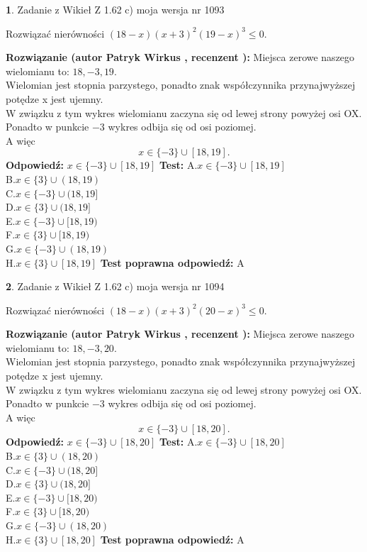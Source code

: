 \documentclass[12pt, a4paper]{article}
\theoremstyle{definition} %
\newtheorem{zad}{}
\newcommand{\zadStart}[1]{\begin{zad}#1\newline}
\newcommand{\zadStop}{\end{zad}}
\newcommand{\rozwStart}[2]{\noindent \textbf{Rozwiązanie (autor #1 , recenzent #2): }\newline}
\newcommand{\rozwStop}{\newline}
\newcommand{\odpStart}{\noindent \textbf{Odpowiedź:}\newline}
\newcommand{\odpStop}{\newline}
\newcommand{\testStart}{\noindent \textbf{Test:}\newline}
\newcommand{\testStop}{\newline}
\newcommand{\kluczStart}{\noindent \textbf{Test poprawna odpowiedź:}\newline}
\newcommand{\kluczStop}{\newline}
\begin{document}
\zadStart{Zadanie z Wikieł Z 1.62 c) moja wersja nr 1093}

Rozwiązać nierówności $(18-x)(x+3)^{2}(19-x)^{3}\le0$.
\zadStop
\rozwStart{Patryk Wirkus}{}
Miejsca zerowe naszego wielomianu to: $18, -3, 19$.\\
Wielomian jest stopnia parzystego, ponadto znak współczynnika przy\linebreak najwyższej potędze x jest ujemny.\\ W związku z tym wykres wielomianu zaczyna się od lewej strony powyżej osi OX.\\
Ponadto w punkcie $-3$ wykres odbija się od osi poziomej.\\
A więc $$x \in \{-3\} \cup [18,19].$$
\rozwStop
\odpStart
$x \in \{-3\} \cup [18,19]$
\odpStop
\testStart
A.$x \in \{-3\} \cup [18,19]$\\
B.$x \in \{3\} \cup (18,19)$\\
C.$x \in \{-3\} \cup (18,19]$\\
D.$x \in \{3\} \cup (18,19]$\\
E.$x \in \{-3\} \cup [18,19)$\\
F.$x \in \{3\} \cup [18,19)$\\
G.$x \in \{-3\} \cup (18,19)$\\
H.$x \in \{3\} \cup [18,19]$
\testStop
\kluczStart
A
\kluczStop



\zadStart{Zadanie z Wikieł Z 1.62 c) moja wersja nr 1094}

Rozwiązać nierówności $(18-x)(x+3)^{2}(20-x)^{3}\le0$.
\zadStop
\rozwStart{Patryk Wirkus}{}
Miejsca zerowe naszego wielomianu to: $18, -3, 20$.\\
Wielomian jest stopnia parzystego, ponadto znak współczynnika przy\linebreak najwyższej potędze x jest ujemny.\\ W związku z tym wykres wielomianu zaczyna się od lewej strony powyżej osi OX.\\
Ponadto w punkcie $-3$ wykres odbija się od osi poziomej.\\
A więc $$x \in \{-3\} \cup [18,20].$$
\rozwStop
\odpStart
$x \in \{-3\} \cup [18,20]$
\odpStop
\testStart
A.$x \in \{-3\} \cup [18,20]$\\
B.$x \in \{3\} \cup (18,20)$\\
C.$x \in \{-3\} \cup (18,20]$\\
D.$x \in \{3\} \cup (18,20]$\\
E.$x \in \{-3\} \cup [18,20)$\\
F.$x \in \{3\} \cup [18,20)$\\
G.$x \in \{-3\} \cup (18,20)$\\
H.$x \in \{3\} \cup [18,20]$
\testStop
\kluczStart
A
\kluczStop
\end{document}
